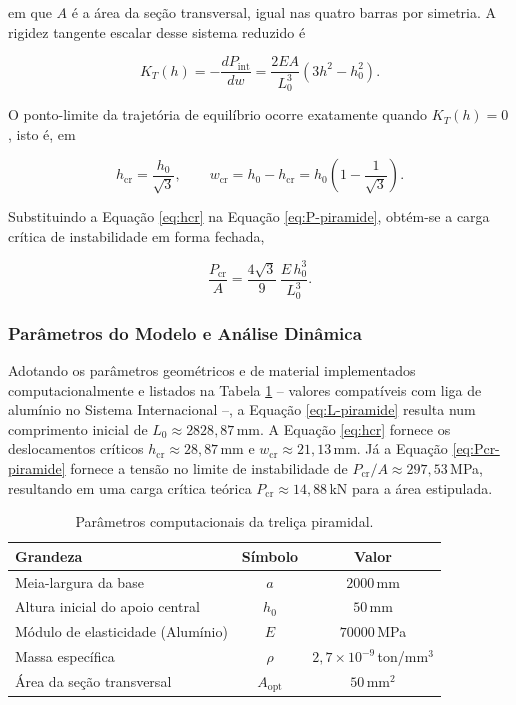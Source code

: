 em que $A$ é a área da seção transversal, igual nas quatro barras por simetria. A rigidez tangente escalar desse sistema reduzido é
 
\begin{equation}
  K_T(h) = -\dfrac{dP_{\text{int}}}{dw} =
  \dfrac{2EA}{L_0^3}\left(3h^2 - h_0^2\right).
  \label{eq:KT-piramide}
\end{equation}
 
O ponto-limite da trajetória de equilíbrio ocorre exatamente quando $K_T(h)=0$, isto é, em
 
\begin{equation}
  h_{\text{cr}} = \dfrac{h_0}{\sqrt{3}},
  \qquad
  w_{\text{cr}} = h_0 - h_{\text{cr}} = h_0\!\left(1 -
  \dfrac{1}{\sqrt{3}}\right).
  \label{eq:hcr}
\end{equation}
 
Substituindo a Equação \ref{eq:hcr} na Equação \ref{eq:P-piramide}, obtém-se a carga crítica de instabilidade em forma fechada,
 
\begin{equation}
  \dfrac{P_{\text{cr}}}{A} =
  \dfrac{4\sqrt{3}}{9}\, \dfrac{E\, h_0^3}{L_0^3}.
  \label{eq:Pcr-piramide}
\end{equation}
 
\subsubsection{Parâmetros do Modelo e Análise Dinâmica}
 
Adotando os parâmetros geométricos e de material implementados computacionalmente e listados na Tabela \ref{tab:parametros} -- valores compatíveis com liga de alumínio no Sistema Internacional --, a Equação \ref{eq:L-piramide} resulta num comprimento inicial de $L_0 \approx 2828{,}87\,$mm. A Equação \ref{eq:hcr} fornece os deslocamentos críticos $h_{\text{cr}} \approx 28{,}87\,$mm e $w_{\text{cr}} \approx 21{,}13\,$mm. Já a Equação \ref{eq:Pcr-piramide} fornece a tensão no limite de instabilidade de $P_{\text{cr}}/A \approx 297{,}53\,$MPa, resultando em uma carga crítica teórica $P_{\text{cr}} \approx 14{,}88\,$kN para a área estipulada.

\begin{table}[H]
\centering
\caption{Parâmetros computacionais da treliça piramidal.}
\label{tab:parametros}
\begin{tabular}{lcc}
\toprule
Grandeza & Símbolo & Valor \\
\midrule
Meia-largura da base       & $a$      & $2000\,$mm \\
Altura inicial do apoio central & $h_0$    & $50\,$mm \\
Módulo de elasticidade (Alumínio) & $E$ & $70000\,$MPa \\
Massa específica            & $\rho$   & $2{,}7 \times 10^{-9}\,$ton/mm$^3$ \\
Área da seção transversal   & $A_{\text{opt}}$ & $50\,$mm$^2$ \\
\bottomrule
\end{tabular}
\end{table}

